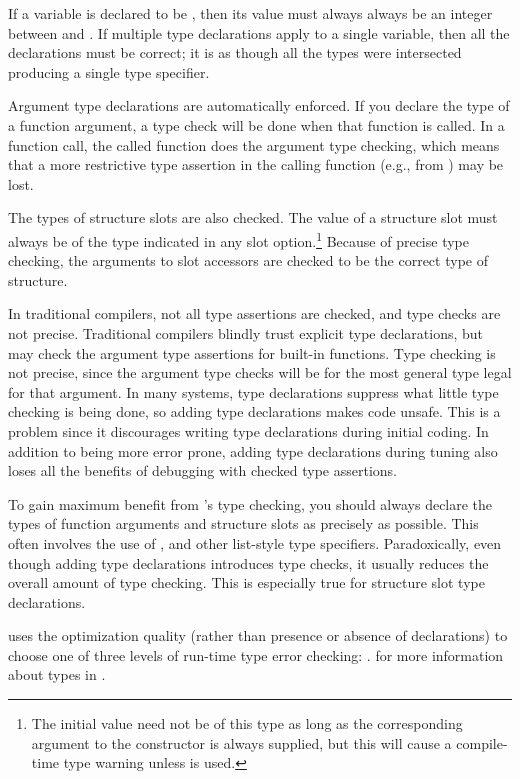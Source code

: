 If a variable is declared to be , then its value must
always always be an integer between  and .  If multiple type
declarations apply to a single variable, then all the declarations must be
correct; it is as though all the types were intersected producing a single
 type specifier.

Argument type declarations are automatically enforced.  If you declare the type
of a function argument, a type check will be done when that function is called.
In a function call, the called function does the argument type checking, which
means that a more restrictive type assertion in the calling function (e.g.,
from ) may be lost.

The types of structure slots are also checked.  The value of a
structure slot must always be of the type indicated in any
 slot option.\footnote{The initial value need not be of
this type as long as the corresponding argument to the constructor is
always supplied, but this will cause a compile-time type warning
unless  is used.} Because of precise type
checking, the arguments to slot accessors are checked to be the
correct type of structure.

In traditional \llisp{} compilers, not all type assertions are checked, and type
checks are not precise.  Traditional compilers blindly trust explicit type
declarations, but may check the argument type assertions for built-in
functions.  Type checking is not precise, since the argument type checks will
be for the most general type legal for that argument.  In many systems, type
declarations suppress what little type checking is being done, so adding type
declarations makes code unsafe.  This is a problem since it discourages
writing type declarations during initial coding.  In addition to being more
error prone, adding type declarations during tuning also loses all the benefits
of debugging with checked type assertions.

To gain maximum benefit from \Python{}'s type checking, you should always declare
the types of function arguments and structure slots as precisely as possible.
This often involves the use of ,  and other list-style type
specifiers.  Paradoxically, even though adding type declarations introduces
type checks, it usually reduces the overall amount of type checking.  This is
especially true for structure slot type declarations.

\Python{} uses the  optimization quality (rather than presence or
absence of declarations) to choose one of three levels of run-time type error
checking: .   for more information about types in \Python.

